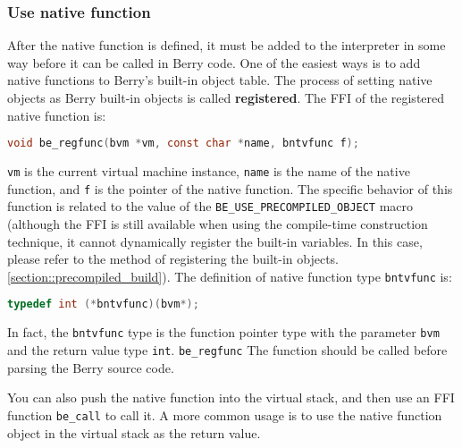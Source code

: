 \subsubsection{Use native function}

After the native function is defined, it must be added to the interpreter in some way before it can be called in Berry code. One of the easiest ways is to add native functions to Berry's built-in object table. The process of setting native objects as Berry built-in objects is called \textbf{registered}. The FFI of the registered native function is:
\begin{lstlisting}[language=c, style=berry, numbers=none]
void be_regfunc(bvm *vm, const char *name, bntvfunc f);
\end{lstlisting}
\texttt{vm} is the current virtual machine instance, \texttt{name} is the name of the native function, and \texttt{f} is the pointer of the native function. The specific behavior of this function is related to the value of the \texttt{BE\_USE\_PRECOMPILED\_OBJECT} macro (although the FFI is still available when using the compile-time construction technique, it cannot dynamically register the built-in variables. In this case, please refer to the method of registering the built-in objects. \ref{section::precompiled_build}). The definition of native function type \texttt{bntvfunc} is:
\begin{lstlisting}[language=c, style=berry, numbers=none]
typedef int (*bntvfunc)(bvm*);
\end{lstlisting}
In fact, the \texttt{bntvfunc} type is the function pointer type with the parameter \texttt{bvm} and the return value type \texttt{int}. \texttt{be\_regfunc} The function should be called before parsing the Berry source code.

You can also push the native function into the virtual stack, and then use an FFI function \texttt{be\_call} to call it. A more common usage is to use the native function object in the virtual stack as the return value.

